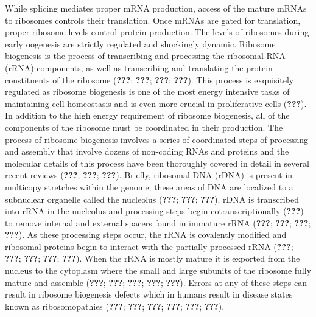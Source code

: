 \documentclass[12pt,oneside]{reedthesis}
\begin{document}
While splicing mediates proper mRNA production, access of the mature
mRNAs to ribosomes controls their translation. Once mRNAs are gated for
translation, proper ribosome levels control protein production. The
levels of ribosomes during early oogenesis are strictly regulated and
shockingly dynamic. Ribosome biogenesis is the process of transcribing
and processing the ribosomal RNA (rRNA) components, as well as
transcribing and translating the protein constituents of the ribosome
({\textbf{???}}; {\textbf{???}}; {\textbf{???}}; {\textbf{???}}). This
process is exquisitely regulated as ribosome biogenesis is one of the
most energy intensive tasks of maintaining cell homeostasis and is even
more crucial in proliferative cells ({\textbf{???}}). In addition to
the high energy requirement of ribosome biogenesis, all of the
components of the ribosome must be coordinated in their production. The
process of ribosome biogenesis involves a series of coordinated steps of
processing and assembly that involve dozens of non-coding RNAs and
proteins and the molecular details of this process have been thoroughly
covered in detail in several recent reviews ({\textbf{???}}; {\textbf{???}}; {\textbf{???}}). Briefly, ribosomal DNA (rDNA) is present in
multicopy stretches within the genome; these areas of DNA are localized
to a subnuclear organelle called the nucleolus ({\textbf{???}}; {\textbf{???}}; {\textbf{???}}). rDNA is transcribed into rRNA in
the nucleolus and processing steps begin cotranscriptionally
({\textbf{???}}) to remove internal and external spacers found in immature
rRNA ({\textbf{???}}; {\textbf{???}}; {\textbf{???}}; {\textbf{???}}). As these processing steps occur, the rRNA is
covalently modified and ribosomal proteins begin to interact with the
partially processed rRNA ({\textbf{???}}; {\textbf{???}}; {\textbf{???}}; {\textbf{???}}; {\textbf{???}}). When the rRNA is mostly
mature it is exported from the nucleus to the cytoplasm where the small
and large subunits of the ribosome fully mature and assemble
({\textbf{???}}; {\textbf{???}}; {\textbf{???}}; {\textbf{???}}; {\textbf{???}}). Errors at any of these steps can result in ribosome
biogenesis defects which in humans result in disease states known as
ribosomopathies ({\textbf{???}}; {\textbf{???}}; {\textbf{???}}; {\textbf{???}}; {\textbf{???}}; {\textbf{???}}).
\end{document}
